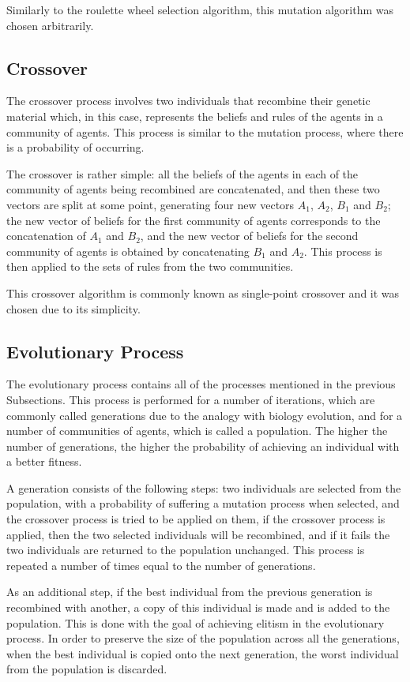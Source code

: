 Similarly to the roulette wheel selection algorithm, this mutation algorithm was
chosen arbitrarily.

\subsection{Crossover}
\label{subsection:crossover}

The crossover process involves two individuals that recombine their genetic
material which, in this case, represents the beliefs and rules of the agents in
a community of agents. This process is similar to the mutation process, where
there is a probability of occurring.

The crossover is rather simple: all the beliefs of the agents in each of the
community of agents being recombined are concatenated, and then these two
vectors are split at some point, generating four new vectors $A_1$, $A_2$, $B_1$
and $B_2$; the new vector of beliefs for the first community of agents
corresponds to the concatenation of $A_1$ and $B_2$, and the new vector of
beliefs for the second community of agents is obtained by concatenating $B_1$
and $A_2$. This process is then applied to the sets of rules from the two
communities.

This crossover algorithm is commonly known as single-point crossover and it was
chosen due to its simplicity.

\subsection{Evolutionary Process}
\label{subsection:evolutionary-process}

The evolutionary process contains all of the processes mentioned in the previous
Subsections. This process is performed for a number of iterations, which are
commonly called generations due to the analogy with biology evolution, and for a
number of communities of agents, which is called a population. The higher the
number of generations, the higher the probability of achieving an individual
with a better fitness.

A generation consists of the following steps: two individuals are selected from
the population, with a probability of suffering a mutation process when
selected, and the crossover process is tried to be applied on them, if the
crossover process is applied, then the two selected individuals will be
recombined, and if it fails the two individuals are returned to the population
unchanged. This process is repeated a number of times equal to the number of
generations.

As an additional step, if the best individual from the previous generation is
recombined with another, a copy of this individual is made and is added to the
population. This is done with the goal of achieving elitism in the evolutionary
process. In order to preserve the size of the population across all the
generations, when the best individual is copied onto the next generation, the
worst individual from the population is discarded.
